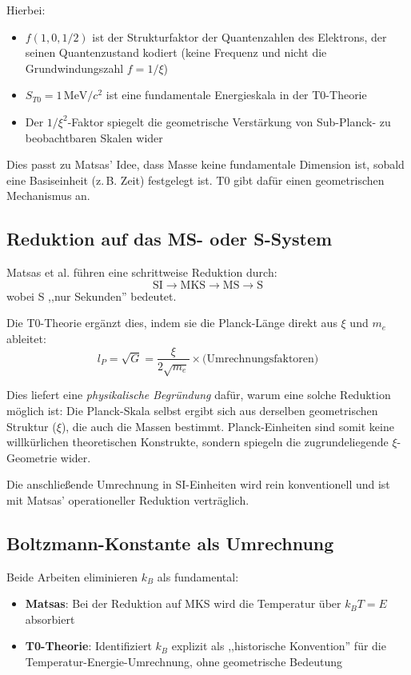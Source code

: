	Hierbei:
	\begin{itemize}
		\item $f(1,0,1/2)$ ist der Strukturfaktor der Quantenzahlen des Elektrons, der seinen Quantenzustand kodiert (keine Frequenz und nicht die Grundwindungszahl $f = 1/\xi$)
		\item $S_{T0} = 1\,\text{MeV}/c^2$ ist eine fundamentale Energieskala in der T0-Theorie
		\item Der $1/\xi^2$-Faktor spiegelt die geometrische Verstärkung von Sub-Planck- zu beobachtbaren Skalen wider
	\end{itemize}

	Dies passt zu Matsas' Idee, dass Masse keine fundamentale Dimension ist, sobald eine Basiseinheit (z.\,B. Zeit) festgelegt ist. T0 gibt dafür einen geometrischen Mechanismus an.
	
	\subsection{Reduktion auf das MS- oder S-System}
	
	Matsas et al. führen eine schrittweise Reduktion durch:
	\[
	\text{SI} \to \text{MKS} \to \text{MS} \to \text{S}
	\]
	wobei S ,,nur Sekunden'' bedeutet.
	
	Die T0-Theorie ergänzt dies, indem sie die Planck-Länge direkt aus $\xi$ und $m_e$ ableitet:
	\[
	l_P = \sqrt{G} = \frac{\xi}{2\sqrt{m_e}} \times \text{(Umrechnungsfaktoren)}
	\]
	
	Dies liefert eine \emph{physikalische Begründung} dafür, warum eine solche Reduktion möglich ist: Die Planck-Skala selbst ergibt sich aus derselben geometrischen Struktur ($\xi$), die auch die Massen bestimmt. Planck-Einheiten sind somit keine willkürlichen theoretischen Konstrukte, sondern spiegeln die zugrundeliegende $\xi$-Geometrie wider.
	
	Die anschließende Umrechnung in SI-Einheiten wird rein konventionell und ist mit Matsas' operationeller Reduktion verträglich.
	
	\subsection{Boltzmann-Konstante als Umrechnung}
	
	Beide Arbeiten eliminieren $k_B$ als fundamental:
	
	\begin{itemize}
		\item \textbf{Matsas}: Bei der Reduktion auf MKS wird die Temperatur über $k_B T = E$ absorbiert
		\item \textbf{T0-Theorie}: Identifiziert $k_B$ explizit als ,,historische Konvention'' für die Temperatur-Energie-Umrechnung, ohne geometrische Bedeutung
	\end{itemize}
	
